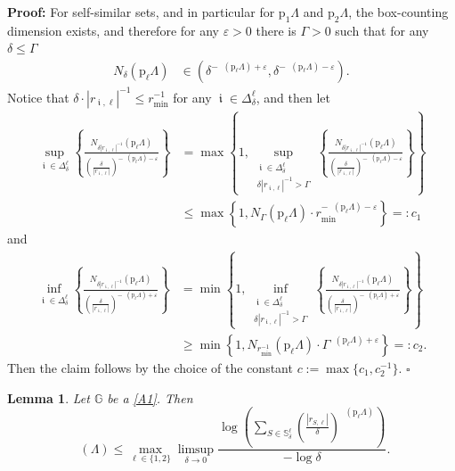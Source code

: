\documentclass[a4paper, 11pt]{article}
\newenvironment{Proof}{\noindent \textbf{Proof:}}{\hfill$\square$\\}
\DeclareMathOperator{\iii}{\mathfrak{i}}
\DeclareMathOperator{\dB}{\dim_{\mathrm{B}}}
\DeclareMathOperator{\dUB}{\overline{\dim}_{\mathrm{B}}}
\numberwithin{equation}{section}
\theoremstyle{plain}
\newtheorem{lemma}[theorem]{Lemma}
\theoremstyle{remark}
\theoremstyle{definition}
\begin{document}
\begin{Proof}
	\noindent For self-similar sets, and in particular for $\mathrm{p}_1\Lambda$ and $\mathrm{p}_2\Lambda$, the box-counting dimension exists, and therefore for any $\varepsilon>0$ there is $\Gamma > 0$ such that for any $\delta \leq \Gamma$
	\begin{align*}
		N_\delta(\mathrm{p}_\ell\Lambda) &\in \left(\delta^{-\dB(\mathrm{p}_\ell\Lambda)+\varepsilon},\delta^{-\dB(\mathrm{p}_\ell\Lambda)-\varepsilon}\right).
	\end{align*}
    Notice that $\delta \cdot |r_{\iii,\ell}|^{-1} \leq r_{\min}^{-1}$ for any $\iii \in \Delta_\delta^\ell$, and then let
		\begin{align*}
				\sup_{\iii \in \Delta_\delta^\ell} \left\{
				\frac{N_{\delta |r_{\iii,\ell}|^{-1}}(\mathrm{p}_\ell\Lambda)}
				{\left(\frac{\delta}{|r_{\iii,\ell}|}\right)^{-\dB(\mathrm{p}_\ell\Lambda)-\varepsilon}}
				\right\}
				&= \max \left\{ 1, \sup_{\substack{\iii \in \Delta_\delta^\ell \\ \delta |r_{\iii,\ell}|^{-1} > \Gamma}}
				\left\{ \frac{N_{\delta |r_{\iii,\ell}|^{-1}}(\mathrm{p}_\ell\Lambda)}
				{\left(\frac{\delta}{|r_{\iii,\ell}|}\right)^{-\dB(\mathrm{p}_\ell\Lambda)-\varepsilon}}
				\right\} \right\} \\
				&\leq \max \left\{ 1, N_{\Gamma}(\mathrm{p}_\ell\Lambda)
				\cdot r_{\min}^{-\dB(\mathrm{p}_\ell\Lambda)-    					\varepsilon}
				\right\} =: c_1
			\end{align*}
		and
		\begin{align*}
				\inf_{\iii \in \Delta_\delta^\ell} \left\{
				\frac{N_{\delta |r_{\iii,\ell}|^{-1}}(\mathrm{p}_\ell\Lambda)}
				{\left(\frac{\delta}{|r_{\iii,\ell}|}\right)^{-\dB(\mathrm{p}_\ell\Lambda)+\varepsilon}}
				\right\}
				&= \min \left\{ 1, \inf_{\substack{\iii \in \Delta_\delta^\ell \\ \delta |r_{\iii,\ell}|^{-1} > \Gamma}}
				\left\{ \frac{N_{\delta |r_{\iii,\ell}|^{-1}}(\mathrm{p}_\ell\Lambda)}
				{\left(\frac{\delta}{|r_{\iii,\ell}|}\right)^{-\dB(\mathrm{p}_\ell\Lambda)+\varepsilon}}
				\right\} \right\} \\
				&\geq \min \left\{ 1,
				N_{r_{\min}^{-1}}(\mathrm{p}_\ell\Lambda)
				\cdot \Gamma^{\dB(\mathrm{p}_\ell\Lambda)+\varepsilon}
				\right\} =: c_2.
			\end{align*}
Then the claim follows by the choice of the constant $c:= \max\{c_1, c_2^{-1}\}$. \end{Proof}
\begin{lemma}\label{lem:step1}
Let $\mathbb{G}$ be a \ref{A1}. Then 
\begin{equation*}
	\dUB(\Lambda)\leq\max_{\ell\in\{1,2\}}\limsup_{\delta\to0}\frac{\log\left(\sum_{S\in\mathbb{S}_{\delta}^{\ell}}\left(\frac{|r_{S,\ell}|}{\delta}\right)^{\dB(\mathrm{p}_\ell\Lambda)}\right)}{-\log\delta}.
\end{equation*}
\end{lemma}
\end{document}

